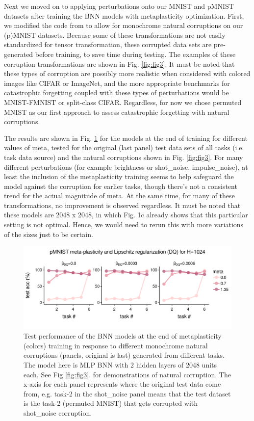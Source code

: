 \documentclass[manuscript,screen,review]{acmart}
\begin{document}
Next we moved on to applying perturbations onto our MNIST and pMNIST datasets after training the BNN models with metaplasticity optimization. First, we modified the code from \cite{Hendrycks_2018} to allow for monochrome natural corruptions on our (p)MNIST datasets. Because some of these transformations are not easily standardized for tensor transformation, these corrupted data sets are pre-generated before training, to save time during testing. The examples of these corruption transformations are shown in Fig. \ref{fig:fig3}. It must be noted that these types of corruption are possibly more realistic when considered with colored images like CIFAR or ImageNet, and the more appropriate benchmarks for catastrophic forgetting coupled with these types of perturbations would be MNIST-FMNIST or split-class CIFAR. Regardless, for now we chose permuted MNIST as our first approach to assess catastrophic forgetting with natural corruptions.

The results are shown in Fig. \ref{fig:fig4} for the models at the end of training for different values of meta, tested for the original (last panel) test data sets of all tasks (i.e. task data source) and the natural corruptions shown in Fig. \ref{fig:fig3}. For many different perturbations (for example brightness or shot\_noise, impulse\_noise), at least the inclusion of the metaplasticity training seems to help safeguard the model against the corruption for earlier tasks, though there’s not a consistent trend for the actual magnitude of meta. At the same time, for many of these transformations, no improvement is observed regardless. It must be noted that these models are 2048 x 2048, in which Fig. 1c already shows that this particular setting is not optimal. Hence, we would need to rerun this with more variations of the sizes just to be certain. 


\begin{figure}[h]
    \centering
    \includegraphics[width=\textwidth]{figures/report/Fig4.pdf}
    \caption{Test performance of the BNN models at the end of metaplasticity (colors) training in response to different monochrome natural corruptions (panels, original is last) generated from different tasks. The model here is MLP BNN with 2 hidden layers of 2048 units each. See Fig \ref{fig:fig3}. for demonstrations of natural corruption. The x-axis for each panel represents where the original test data come from, e.g. task-2 in the shot\_noise panel means that the test dataset is the task-2 (permuted MNIST) that gets corrupted with shot\_noise corruption. }
    \label{fig:fig4}
\end{figure}
\end{document}
